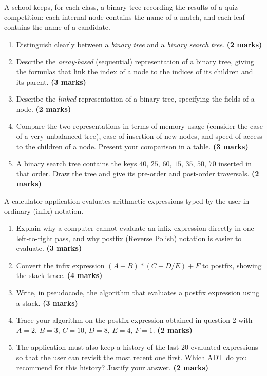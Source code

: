 \documentclass[11pt]{article}
\begin{document}
\begin{exercice}
A school keeps, for each class, a binary tree recording the results of a quiz competition: each internal node contains the name of a match, and each leaf contains the name of a candidate.
\begin{enumerate}
\item Distinguish clearly between a \emph{binary tree} and a \emph{binary search tree}. \textbf{(2 marks)}
\item Describe the \emph{array-based} (sequential) representation of a binary tree, giving the formulas that link the index of a node to the indices of its children and its parent. \textbf{(3 marks)}
\item Describe the \emph{linked} representation of a binary tree, specifying the fields of a node. \textbf{(2 marks)}
\item Compare the two representations in terms of memory usage (consider the case of a very unbalanced tree), ease of insertion of new nodes, and speed of access to the children of a node. Present your comparison in a table. \textbf{(3 marks)}
\item A binary search tree contains the keys $40$, $25$, $60$, $15$, $35$, $50$, $70$ inserted in that order. Draw the tree and give its pre-order and post-order traversals. \textbf{(2 marks)}
\end{enumerate}
\end{exercice}

\begin{exercice}
A calculator application evaluates arithmetic expressions typed by the user in ordinary (infix) notation.
\begin{enumerate}
\item Explain why a computer cannot evaluate an infix expression directly in one left-to-right pass, and why postfix (Reverse Polish) notation is easier to evaluate. \textbf{(3 marks)}
\item Convert the infix expression $(A + B) * (C - D / E) + F$ to postfix, showing the stack trace. \textbf{(4 marks)}
\item Write, in pseudocode, the algorithm that evaluates a postfix expression using a stack. \textbf{(3 marks)}
\item Trace your algorithm on the postfix expression obtained in question 2 with $A = 2$, $B = 3$, $C = 10$, $D = 8$, $E = 4$, $F = 1$. \textbf{(2 marks)}
\item The application must also keep a history of the last $20$ evaluated expressions so that the user can revisit the most recent one first. Which ADT do you recommend for this history? Justify your answer. \textbf{(2 marks)}
\end{enumerate}
\end{exercice}
\end{document}

